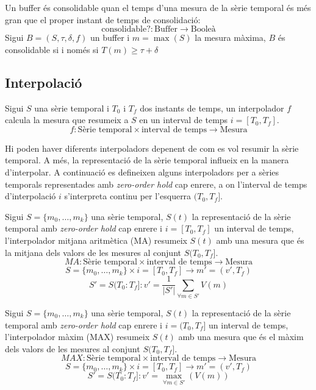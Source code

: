 \begin{definition}
  Un buffer és consolidable quan el temps d'una mesura de la sèrie temporal és més gran que el proper instant de temps de consolidació:
  \[
  \text{consolidable?}: \text{Buffer} \longrightarrow \text{Booleà}
  \]
  Sigui $B=(S,\tau,\delta,f)$ un buffer i $m=\max(S)$ la mesura màxima, $B$ és consolidable si i només si $T(m) \geq \tau+\delta$
\end{definition}


\subsection{Interpolació}
\label{sec:model:interpolador}

Sigui $S$ una sèrie temporal i $T_0$ i $T_f$ dos instants de temps, un interpolador $f$ calcula la mesura que resumeix a $S$ en un interval de temps $i=[T_0,T_f]$. 
\[
f: \text{Sèrie temporal} \times \text{interval de temps} \longrightarrow \text{Mesura}
\]

Hi poden haver diferents interpoladors depenent de com es vol resumir la sèrie temporal. A més, la representació de la sèrie temporal influeix en la manera d'interpolar. A continuació es defineixen alguns interpoladors per a sèries temporals representades amb  \emph{zero-order hold} cap enrere, a on l'interval de temps d'interpolació $i$ s'interpreta continu per l'esquerra $(T_0,T_f]$. 


\begin{definition}
  Sigui $S=\{m_0,\ldots,m_k\}$ una sèrie temporal, $S(t)$ la
  representació de la sèrie temporal amb \emph{zero-order hold} cap
  enrere i $i=[T_0,T_f]$ un interval de temps, l'interpolador mitjana
  aritmètica (MA) resumeix $S(t)$ amb una mesura que és la mitjana dels
  valors de les mesures al conjunt $S(T_0,T_f]$.
\[
MA: \text{Sèrie temporal} \times \text{interval de temps}
\longrightarrow \text{Mesura}
\]
\[
S=\{m_0,\ldots,m_k\} \times i=[T_0,T_f] \longrightarrow m'=(v',T_f)
\]
\[
S'=S(T_0:T_f]:
v' = \frac{1}{|S'|} \sum\limits_{\forall m\in S'} V(m)
\]
\end{definition}

\begin{definition}
  Sigui $S=\{m_0,\ldots,m_k\}$ una sèrie temporal, $S(t)$ la
  representació de la sèrie temporal amb \emph{zero-order hold} cap
  enrere i $i=(T_0,T_f]$ un interval de temps, l'interpolador màxim
  (MAX) resumeix $S(t)$ amb una mesura que és el màxim dels valors
  de les mesures al conjunt $S(T_0,T_f]$.
\[
MAX: \text{Sèrie temporal} \times \text{interval de temps} \longrightarrow \text{Mesura}
\]
\[
S=\{m_0,\ldots,m_k\} \times i=[T_0,T_f]  \longrightarrow m'=(v',T_f)
\]
\[
S'=S(T_0:T_f]:
v' = \max_{\forall m \in S'}(V(m))
\]
\end{definition}

